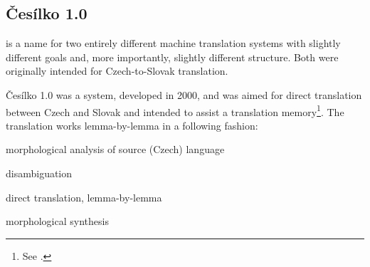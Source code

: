 \begin{comment}
\subsubsection{Dictionary coverage of WebColl}

The dictionary contains about 8,000 lexical items. However, the domain of the translation and, therefore, the dictionary, was manuals for old computers from 1980's. 

In different experiments (\cite{florida}), we tried to measure how many nouns from the RUSLAN dictionary appear at all in a modern text.

For that, we used a monolingual Czech corpus WebColl, consisting of roughly 7~million sentences (114~million tokens)\footnote{See \cite{webcoll}}.

RUSLAN dictionary has 2,783 nouns. In the WebColl corpus, from those nouns, 611 appear less than 10 times -- and from those, 412 don't appear \emph{at all}.

The reverse is similarly infavourable: from 39,434,505 nouns in the corpus, only 11,862,221 is in the dictionary.

\subsubsection{Experiments}

Despite the general un-maintainability of the RUSLAN code and despite the small dictionary, we tried to run the system on our test data.

However, all our experiments ended in some sort of error.

Because I am not able to code in neither Systems-Q nor FORTRAN (in which the Systems-Q interpreter is coded), I gave up on this experiment. (?????)

\end{comment}

\subsection{Česílko 1.0}

 is a name for two entirely different machine translation systems with slightly different goals and, more importantly, slightly different structure. Both were originally intended for Czech-to-Slovak translation.

Česílko 1.0 was a system, developed in 2000, and was aimed for direct translation between Czech and Slovak and intended to assist a translation memory\footnote{See \cite{cesilko1}.}. The translation works lemma-by-lemma in a following fashion:
\begin{pitemize}
\item morphological analysis of source (Czech) language
\item disambiguation
\item direct translation, lemma-by-lemma
\item morphological synthesis
\end{pitemize}



